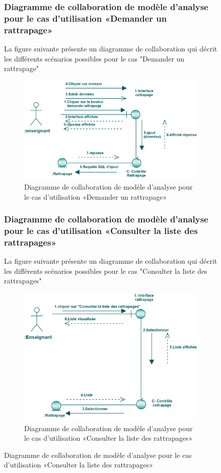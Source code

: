 \documentclass[12 pt]{report}
\begin{document}
\begin{figure}[h]
\begin{center}
\subsubsection{Diagramme  de  collaboration  de  modèle  d'analyse  pour  le  cas  d'utilisation «Demander un rattrapage»  }
La figure suivante présente un diagramme de collaboration qui décrit les différents
scénarios possibles pour le cas "Demander un rattrapage"
\begin{figure}[h]
\begin{center}
\includegraphics[width= 14 cm , height =5 cm]{colla_ens_demande_rattrapage.PNG}
 \caption{Diagramme  de  collaboration  de  modèle  d'analyse  pour  le  cas  d'utilisation «Demander un rattrapage»}
\end{center}
\end{figure} 
\subsubsection{Diagramme  de  collaboration  de  modèle  d'analyse  pour  le  cas  d'utilisation «Consulter la liste des rattrapages»  }
La figure suivante présente un diagramme de collaboration qui décrit les différents
scénarios possibles pour le cas "Consulter la liste des rattrapages"
\begin{figure}[h]
\begin{center}
\includegraphics[width= 12 cm , height =5 cm]{cce.PNG}
 \caption{Diagramme  de  collaboration  de  modèle  d'analyse  pour  le  cas  d'utilisation «Consulter la liste des rattrapages»}
\end{center}
\end{figure}


\end{center}
\end{figure}
\end{document}
